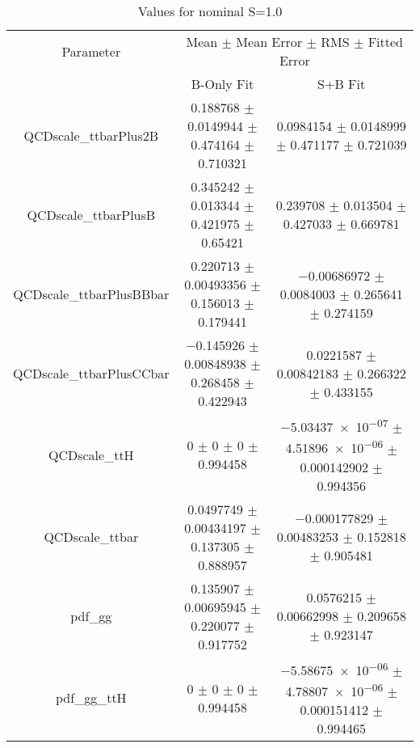 \begin{table}
\centering
\caption{Values for nominal S=1.0}
\begin{tabular}{ccc}
\toprule
Parameter & \multicolumn{2}{c}{Mean $\pm$ Mean Error $\pm$ RMS $\pm$ Fitted Error}\\
 & B-Only Fit & S+B Fit\\
\midrule
QCDscale\_ttbarPlus2B & \num{0.188768} $\pm$ \num{0.0149944} $\pm$ \num{0.474164} $\pm$ \num{0.710321} & \num{0.0984154} $\pm$ \num{0.0148999} $\pm$ \num{0.471177} $\pm$ \num{0.721039}\\
QCDscale\_ttbarPlusB & \num{0.345242} $\pm$ \num{0.013344} $\pm$ \num{0.421975} $\pm$ \num{0.65421} & \num{0.239708} $\pm$ \num{0.013504} $\pm$ \num{0.427033} $\pm$ \num{0.669781}\\
QCDscale\_ttbarPlusBBbar & \num{0.220713} $\pm$ \num{0.00493356} $\pm$ \num{0.156013} $\pm$ \num{0.179441} & \num{-0.00686972} $\pm$ \num{0.0084003} $\pm$ \num{0.265641} $\pm$ \num{0.274159}\\
QCDscale\_ttbarPlusCCbar & \num{-0.145926} $\pm$ \num{0.00848938} $\pm$ \num{0.268458} $\pm$ \num{0.422943} & \num{0.0221587} $\pm$ \num{0.00842183} $\pm$ \num{0.266322} $\pm$ \num{0.433155}\\
QCDscale\_ttH & \num{0} $\pm$ \num{0} $\pm$ \num{0} $\pm$ \num{0.994458} & \num{-5.03437e-07} $\pm$ \num{4.51896e-06} $\pm$ \num{0.000142902} $\pm$ \num{0.994356}\\
QCDscale\_ttbar & \num{0.0497749} $\pm$ \num{0.00434197} $\pm$ \num{0.137305} $\pm$ \num{0.888957} & \num{-0.000177829} $\pm$ \num{0.00483253} $\pm$ \num{0.152818} $\pm$ \num{0.905481}\\
pdf\_gg & \num{0.135907} $\pm$ \num{0.00695945} $\pm$ \num{0.220077} $\pm$ \num{0.917752} & \num{0.0576215} $\pm$ \num{0.00662998} $\pm$ \num{0.209658} $\pm$ \num{0.923147}\\
pdf\_gg\_ttH & \num{0} $\pm$ \num{0} $\pm$ \num{0} $\pm$ \num{0.994458} & \num{-5.58675e-06} $\pm$ \num{4.78807e-06} $\pm$ \num{0.000151412} $\pm$ \num{0.994465}\\
\bottomrule
\end{tabular}
\end{table}